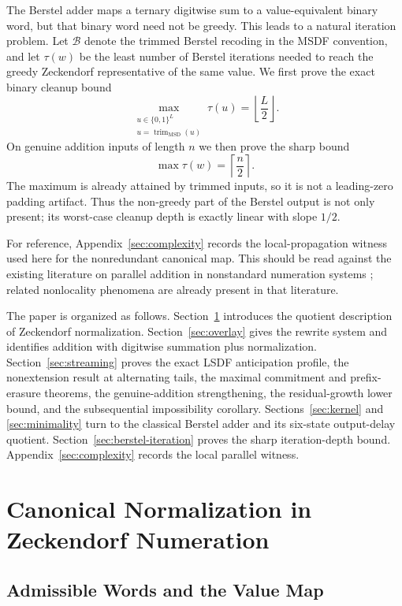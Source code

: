 \documentclass[11pt,letterpaper]{article}
\numberwithin{equation}{section}
\theoremstyle{plain}
\theoremstyle{definition}
\theoremstyle{remark}
\newcommand{\Berstel}{\mathcal{B}}
\newcommand{\trimMSD}{\operatorname{trim}_{\mathrm{MSD}}}
\begin{document}
The Berstel adder maps a ternary digitwise sum to a value-equivalent binary
word, but that binary word need not be greedy.  This leads to a natural
iteration problem.  Let $\Berstel$ denote the trimmed Berstel recoding in the
MSDF convention, and let $\tau(w)$ be the least number of Berstel iterations
needed to reach the greedy Zeckendorf representative of the same value.  We
first prove the exact binary cleanup bound
\[
\max_{\substack{u\in\{0,1\}^L\\ u=\trimMSD(u)}}\tau(u)
=
\left\lfloor\frac L2\right\rfloor .
\]
On genuine addition inputs of length $n$ we then prove the sharp bound
\[
\max \tau(w)=\left\lceil\frac n2\right\rceil .
\]
The maximum is already attained by trimmed inputs, so it is not a leading-zero
padding artifact.  Thus the non-greedy part of the Berstel output is not only
present; its worst-case cleanup depth is exactly linear with slope $1/2$.

For reference, Appendix~\ref{sec:complexity} records the local-propagation
witness used here for the nonredundant canonical map.  This should be read
against the existing literature on parallel addition in nonstandard
numeration systems
\cite{FrougnyPelantovaSvobodova2013MinimalDigitSets}; related nonlocality
phenomena are already present in that literature.

The paper is organized as follows.  Section~\ref{sec:preliminaries} introduces
the quotient description of Zeckendorf normalization.  Section~\ref{sec:overlay}
gives the rewrite system and identifies addition with digitwise summation plus
normalization.  Section~\ref{sec:streaming} proves the exact LSDF
anticipation profile, the nonextension result at alternating tails, the
maximal commitment and prefix-erasure theorems, the genuine-addition
strengthening, the residual-growth lower bound, and the subsequential
impossibility corollary.  Sections~\ref{sec:kernel} and
\ref{sec:minimality} turn to the classical Berstel adder and its six-state
output-delay quotient.  Section~\ref{sec:berstel-iteration} proves the sharp
iteration-depth bound.  Appendix~\ref{sec:complexity} records the local
parallel witness.

\section{Canonical Normalization in Zeckendorf Numeration}\label{sec:preliminaries}

\subsection{Admissible Words and the Value Map}
\end{document}
